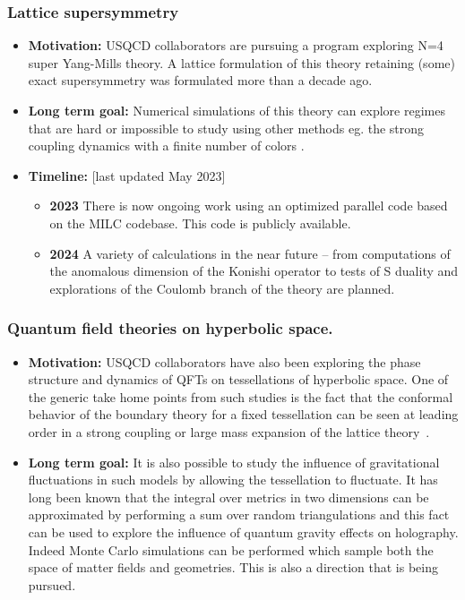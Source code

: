 \documentclass[12pt,hyperpdf]{article}
\begin{document}
\subsubsection{Lattice supersymmetry}
\begin{itemize}
   \item{ \bf Motivation:}
USQCD collaborators are pursuing a program exploring N=4 super Yang-Mills
theory. 
 A lattice formulation of this theory retaining (some) exact supersymmetry was formulated
more than a decade ago. 
 \item { \bf Long term goal:} Numerical simulations of this theory can explore regimes
that are hard or impossible to study using other methods eg. the strong coupling dynamics
with a finite number of colors \cite{Catterall:2020lsi}. 
\item{\bf Timeline:} \hfill [last updated May 2023]
   \begin{itemize}
   \item{\bf 2023} There is now ongoing work using an optimized parallel code based on the 
MILC codebase. This code is publicly available.
    \item{\bf 2024} A variety of calculations in the near future -- from computations of the anomalous dimension of the Konishi operator to tests of S duality and explorations of the Coulomb branch of the theory are planned.
\end{itemize}
\end{itemize}

\subsubsection{Quantum field theories on hyperbolic space.}

\begin{itemize}
   \item{ \bf Motivation:} USQCD collaborators have also been exploring the phase structure
and dynamics of QFTs on tessellations of hyperbolic space. 
One of the generic take home points from such studies is the fact that the conformal
behavior of the boundary theory for a fixed
tessellation can be seen at leading order in a strong coupling or
large mass expansion of the lattice theory~\cite{Asaduzzaman:2020hjl}.
    \item { \bf Long term goal:} It is also possible to study the influence of gravitational fluctuations in
such models by allowing the tessellation to fluctuate. It has long been known that
the integral over metrics in two dimensions can be approximated by performing a sum
over random triangulations and this fact can be used to explore the influence of
quantum gravity effects on holography. Indeed Monte Carlo simulations can be
performed which sample both the space of matter fields and geometries. This is
also a direction that is being pursued. 
\end{itemize}
\end{document}

